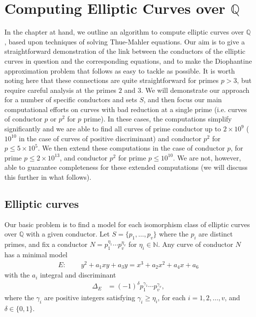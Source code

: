 
\chapter{Computing Elliptic Curves over $\mathbb{Q}$}
\label{ch:EllipticCurves} 

In the chapter at hand, we outline an algorithm to compute elliptic curves over $\mathbb{Q}$, based upon techniques of solving Thue-Mahler equations. Our aim is to give a straightforward demonstration of the link 
between the conductors of the elliptic curves in question and the corresponding equations, and to make the Diophantine approximation problem 
that follows as easy to tackle as possible. It is worth noting here that these connections are quite straightforward for primes $p > 3$, but require 
careful analysis at the primes $2$ and $3$. We will demonstrate our approach for a number of specific conductors and sets $S$, and then focus 
our main computational efforts on curves with bad reduction at a single prime (i.e. curves of conductor $p$ or $p^2$ for 
$p$ prime).  In these cases, the computations simplify significantly and we 
are able to find all curves of prime conductor up to $2 \times 10^9$ ($10^{10}$ in the case of curves of positive 
discriminant) and conductor $p^2$ for $p \leq 5\times 10^5$. We then extend these computations in the case of conductor 
$p$,  for prime $p \leq 2 \times 10^{13}$, and conductor $p^2$ for prime $p \leq 10^{10}$. We are not, however, able to 
guarantee completeness for these extended computations (we will discuss this further in what follows). 



\section{Elliptic curves} \label{elliptic}

Our basic problem is to find a model for each isomorphism class of elliptic curves over $\mathbb{Q}$ with a given 
conductor. Let $S=\{ p_1, \ldots, p_v \}$ where the $p_i$ are distinct primes, and fix a conductor $N= p_1^{\eta_1} \cdots p_v^{\eta_v}$ for
$\eta_i \in \mathbb{N}$.  Any curve of conductor $N$ has a minimal 
model
\begin{align*}
E:&\phantom{=} y^2 + a_1 xy + a_3 y = x^3 + a_2 x^2 + a_4 x + a_6
\end{align*}
with the $a_i$ integral and discriminant 
\begin{align*}
\Delta_E &= (-1)^\delta p_1^{\gamma_1} \cdots p_v^{\gamma_v},
\end{align*}
where the $\gamma_i$ are positive integers satisfying $\gamma_i \geq \eta_i$, for each $i = 1, 2, \ldots, v$, and $\delta \in \{ 0, 1 \}$. 

